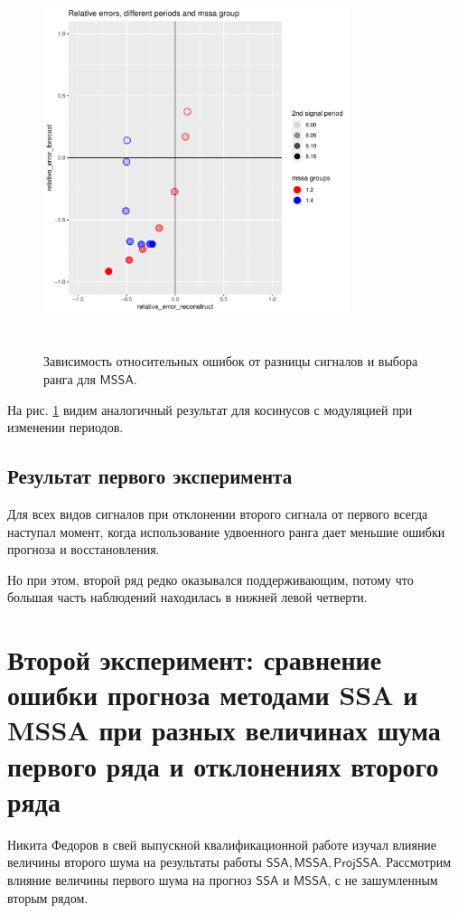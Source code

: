 \documentclass[specialist, substylefile = spbureport.rtx,
    subf,href,colorlinks=true, 12pt]{disser}
\newcommand{\SSA}{\mathsf{SSA}}
\newcommand{\MSSA}{\mathsf{MSSA}}
\newcommand{\ProjSSA}{\mathsf{ProjSSA}}
\begin{document}
        \begin{figure}[h]
            \centering
            \includegraphics[height=11cm, width=0.8\textwidth]{experiment_1_expcos2.pdf}
            \caption{Зависимость относительных ошибок от разницы сигналов и выбора ранга для $\MSSA$.}
            \label{fig:exp1_expcos2}
        \end{figure}

        На рис. \ref{fig:exp1_expcos2} видим аналогичный результат для косинусов с модуляцией при изменении периодов.

    \subsection{Результат первого эксперимента}

        Для всех видов сигналов при отклонении второго сигнала от первого всегда наступал момент, когда использование удвоенного ранга дает меньшие ошибки прогноза и восстановления.

        Но при этом, второй ряд редко оказывался поддерживающим, потому что большая часть наблюдений находилась в нижней левой четверти.


    \section{Второй эксперимент: сравнение ошибки прогноза методами SSA и MSSA при разных величинах шума первого ряда и отклонениях второго ряда}
        Никита Федоров в свей выпускной квалификационной работе изучал влияние величины второго шума на результаты работы $\SSA, \MSSA, \ProjSSA$. Рассмотрим влияние величины первого шума на прогноз $\SSA$ и $\MSSA$, с не зашумленным вторым рядом.
\end{document}
